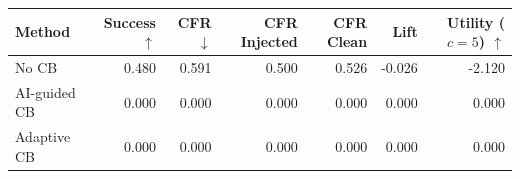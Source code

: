 \begin{tabular}{lrrrrrr}
\toprule
Method & Success $\uparrow$ & CFR $\downarrow$ & CFR Injected & CFR Clean & Lift & Utility ($c=5$) $\uparrow$ \\
\midrule
No CB & 0.480 & 0.591 & 0.500 & 0.526 & -0.026 & -2.120 \\
AI-guided CB & 0.000 & 0.000 & 0.000 & 0.000 & 0.000 & 0.000 \\
Adaptive CB & 0.000 & 0.000 & 0.000 & 0.000 & 0.000 & 0.000 \\
\bottomrule
\end{tabular}
